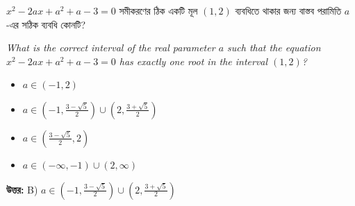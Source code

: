 \documentclass[12pt, a4paper]{article}
\begin{document}
\begin{tcolorbox}[questionbox={প্রশ্ন (Question) 41}]
    \noindent
    $x^2 - 2ax + a^2 + a - 3 = 0$ সমীকরণের ঠিক একটি মূল $(1, 2)$ ব্যবধিতে থাকার জন্য বাস্তব পরামিতি $a$-এর সঠিক ব্যবধি কোনটি?
    
    \vspace{0.8em}
    \begin{english}
    \noindent\textit{\color{darkgray}
    What is the correct interval of the real parameter $a$ such that the equation $x^2 - 2ax + a^2 + a - 3 = 0$ has exactly one root in the interval $(1, 2)$?
    }
    \end{english}
\end{tcolorbox}

\begin{itemize}[label={}, leftmargin=1cm, itemsep=0.5em]
    \item[\textbf{A)}] $a \in (-1, 2)$
    \item[\textbf{B)}] $a \in \left(-1, \frac{3-\sqrt{5}}{2}\right) \cup \left(2, \frac{3+\sqrt{5}}{2}\right)$
    \item[\textbf{C)}] $a \in \left(\frac{3-\sqrt{5}}{2}, 2\right)$
    \item[\textbf{D)}] $a \in (-\infty, -1) \cup \left(2, \infty\right)$
\end{itemize}

\vspace{0.5em}
\begin{tcolorbox}[answerbox]
    \textbf{\color{success} উত্তর:} B) $a \in \left(-1, \frac{3-\sqrt{5}}{2}\right) \cup \left(2, \frac{3+\sqrt{5}}{2}\right)$
\end{tcolorbox}
\vspace{1em}
\end{document}
